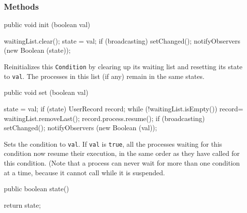 \subsubsection* {Methods}
\begin{code}

   public void init (boolean val) \begin{hide} {
      waitingList.clear();
      state = val;
      if (broadcasting) {
         setChanged();
         notifyObservers (new Boolean (state));
      }
   }\end{hide}
\end{code}
 \begin{tabb}  Reinitializes this \texttt{Condition} by clearing up 
   its waiting list and resetting its state to \texttt{val}.
   The processes in this list (if any) remain in the same states.
 \end{tabb}
\begin{htmlonly}
\end{htmlonly}
\begin{code}

   public void set (boolean val) \begin{hide} { 
      state = val;
      if (state) {
         UserRecord record;
         while (!waitingList.isEmpty()) {
            record= waitingList.removeLast();
            record.process.resume();
         }    
      } 
      if (broadcasting) {
         setChanged();
         notifyObservers (new Boolean (val));
      }
   }\end{hide}
\end{code}
 \begin{tabb}  Sets the condition to \texttt{val}.
   If \texttt{val} is \texttt{true}, all the processes waiting 
   for this condition now resume their execution, in the same order as
   they have called  for this condition.
   (Note that a process can never wait for more than one condition at
   a time, because it cannot call  while it is suspended.
 \end{tabb}
\begin{htmlonly}
\end{htmlonly}
\begin{code}

   public boolean state() \begin{hide} { 
      return state;
   }\end{hide}
\end{code}
